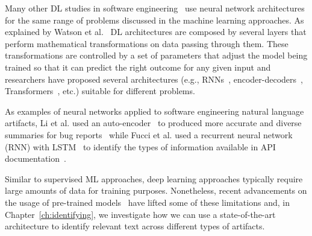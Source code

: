 Many other \acs{DL} studies in software engineering~\cite{ferreira2021,li2018deep}
use neural network architectures 
for the same range of problems discussed in the machine learning approaches.
As explained by Watson et al.~\cite{watson2022}
\acs{DL} architectures are composed by several layers 
that perform mathematical transformations on data passing through them. 
These transformations are controlled by a set of parameters that 
adjust the model being trained so that it can predict 
the right outcome for any given input
and researchers have proposed 
several architectures (e.g., \acs{RNN}s~\cite{rumelhart1986rnn, sutskever2014seq2seq}, encoder-decoders~\cite{bahdanau2014neural}, Transformers~\cite{Vaswani2017attention}, etc.) 
suitable for different problems. 


As examples of neural networks applied to software engineering natural language artifacts,
Li et al. used an auto-encoder~\cite{liou2014autoencoder}
to produced more accurate and diverse summaries 
for bug reports~\cite{li2018deep} while 
Fucci et al. used a 
recurrent neural network (\acs{RNN}) with 
\acf{LSTM}~\cite{hochreiter1997lstm}
to identify the types of information available in 
API documentation~\cite{fucci2019}.


Similar to supervised \acs{ML} approaches, deep learning approaches 
typically require large amounts of data for training purposes.
Nonetheless, recent advancements on the usage of
pre-trained models~\cite{erhan2010pre-train} 
have lifted some of these limitations and,
in Chapter~\ref{ch:identifying},
we investigate how we can use a state-of-the-art architecture 
to identify relevant text across different types of artifacts.
















